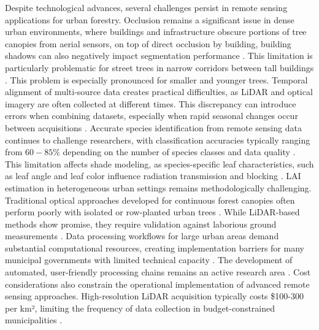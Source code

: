 Despite technological advances, several challenges persist in remote sensing applications for urban forestry. Occlusion remains a significant issue in dense urban environments, where buildings and infrastructure obscure portions of tree canopies from aerial sensors, on top of direct occlusion by building, building shadows can also negatively impact segmentation performance \cite{parmehrEstimationUrbanTree2016}. This limitation is particularly problematic for street trees in narrow corridors between tall buildings \cite{zhuAssessmentSpectralPolarimetric2012}. This problem is especially pronounced for smaller and younger trees.
Temporal alignment of multi-source data creates practical difficulties, as LiDAR and optical imagery are often collected at different times. This discrepancy can introduce errors when combining datasets, especially when rapid seasonal changes occur between acquisitions \cite{whiteRemoteSensingTechnologies2016}.
Accurate species identification from remote sensing data continues to challenge researchers, with classification accuracies typically ranging from $60-85\%$ depending on the number of species classes and data quality \cite{fassnachtReviewStudiesTree2016a}. This limitation affects shade modeling, as species-specific leaf characteristics, such as leaf angle and leaf color influence radiation transmission and blocking \cite{asnerSpectranomicsEmergingScience2016}.
LAI estimation in heterogeneous urban settings remains methodologically challenging. Traditional optical approaches developed for continuous forest canopies often perform poorly with isolated or row-planted urban trees \cite{yanReviewIndirectOptical2019}. While LiDAR-based methods show promise, they require validation against laborious ground measurements \cite{ryuHowQuantifyTree2010,liuComparisonTerrestrialLiDAR2019}.
Data processing workflows for large urban areas demand substantial computational resources, creating implementation barriers for many municipal governments with limited technical capacity \cite{weinsteinIndividualTreeCrownDetection2019b}. The development of automated, user-friendly processing chains remains an active research area \cite{belgiuRandomForestRemote2016}.
Cost considerations also constrain the operational implementation of advanced remote sensing approaches. High-resolution LiDAR acquisition typically costs \$100-300 per km², limiting the frequency of data collection in budget-constrained municipalities \cite{holopainenTreeMappingUsing2013}.

